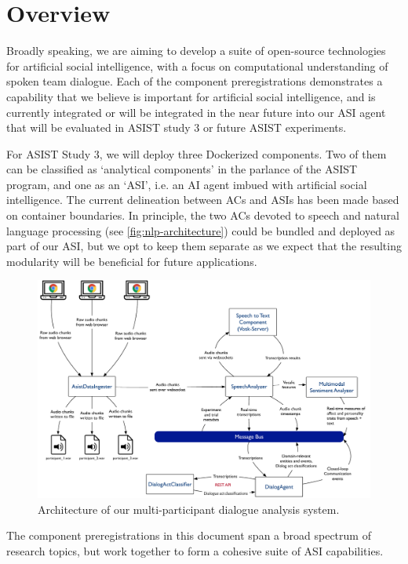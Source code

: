 \section{Overview}

Broadly speaking, we are aiming to develop a suite of open-source technologies
for artificial social intelligence, with a focus on computational understanding
of spoken team dialogue. Each of the component preregistrations demonstrates a
capability that we believe is important for artificial social intelligence, and
is currently integrated or will be integrated in the near future into our ASI
agent that will be evaluated in ASIST study 3 or future ASIST experiments.

For ASIST Study 3, we will deploy three Dockerized components. Two of them can
be classified as `analytical components' in the parlance of the ASIST program,
and one as an `ASI', i.e. an AI agent imbued with artificial social
intelligence. The current delineation between ACs and ASIs has been made based
on container boundaries. In principle, the two ACs devoted to speech and
natural language processing (see \autoref{fig:nlp-architecture}) could be
bundled and deployed as part of our ASI, but we opt to keep them separate as we
expect that the resulting modularity will be beneficial for future
applications.

\begin{figure}
    \centering
    \includegraphics[width=6.5in]{images/nlp_architecture}
    \caption{Architecture of our multi-participant dialogue analysis system.}
    \label{fig:nlp-architecture}
\end{figure}


The component preregistrations in this document span a broad spectrum of
research topics, but work together to form a cohesive suite of ASI
capabilities. 

